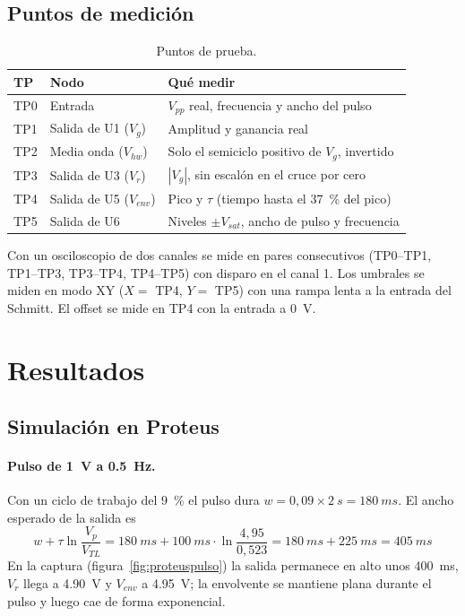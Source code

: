 \documentclass[11pt,letterpaper]{article}
\newcommand{\Vg}{V_g}
\newcommand{\Vr}{V_r}
\newcommand{\Venv}{V_{env}}
\newcommand{\VTL}{V_{TL}}
\newcommand{\Vsat}{V_{sat}}
\begin{document}
\subsection{Puntos de medición}

\begin{table}[H]
\centering
\caption{Puntos de prueba.}\label{tab:tp}
\begin{tabularx}{\linewidth}{@{}llX@{}}
\toprule
TP & Nodo & Qué medir \\
\midrule
TP0 & Entrada & $V_{pp}$ real, frecuencia y ancho del pulso \\
TP1 & Salida de U1 ($\Vg$) & Amplitud y ganancia real \\
TP2 & Media onda ($V_{hw}$) & Solo el semiciclo positivo de $\Vg$, invertido \\
TP3 & Salida de U3 ($\Vr$) & $|\Vg|$, sin escalón en el cruce por cero \\
TP4 & Salida de U5 ($\Venv$) & Pico y $\tau$ (tiempo hasta el \SI{37}{\percent} del pico) \\
TP5 & Salida de U6 & Niveles $\pm\Vsat$, ancho de pulso y frecuencia \\
\bottomrule
\end{tabularx}
\end{table}

Con un osciloscopio de dos canales se mide en pares consecutivos (TP0--TP1, TP1--TP3, TP3--TP4, TP4--TP5) con disparo en el canal 1. Los umbrales se miden en modo XY ($X=$ TP4, $Y=$ TP5) con una rampa lenta a la entrada del Schmitt. El offset se mide en TP4 con la entrada a \SI{0}{V}.

\section{Resultados}

\subsection{Simulación en Proteus}

\paragraph{Pulso de \SI{1}{V} a \SI{0,5}{Hz}.} Con un ciclo de trabajo del \SI{9}{\percent} el pulso dura $w=0{,}09\times\SI{2}{s}=\SI{180}{ms}$. El ancho esperado de la salida es
\begin{equation}
w+\tau\ln\frac{V_p}{\VTL}=\SI{180}{ms}+\SI{100}{ms}\cdot\ln\frac{4{,}95}{0{,}523}=\SI{180}{ms}+\SI{225}{ms}=\SI{405}{ms}
\end{equation}
En la captura (figura~\ref{fig:proteuspulso}) la salida permanece en alto unos \SI{400}{ms}, $\Vr$ llega a \SI{4,90}{V} y $\Venv$ a \SI{4,95}{V}; la envolvente se mantiene plana durante el pulso y luego cae de forma exponencial.
\end{document}
